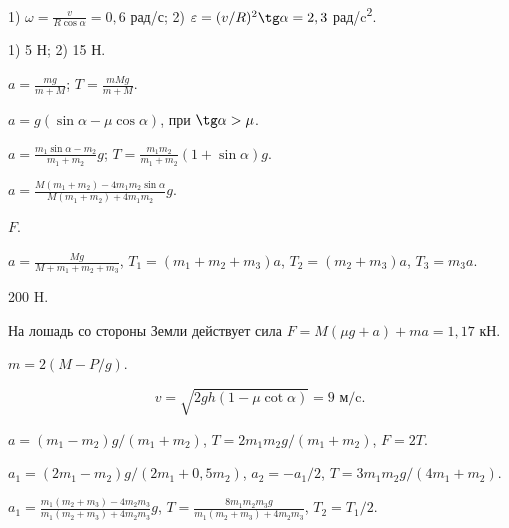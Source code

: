 \begin{Answer}{54}
1) $\omega = \frac{v}{R \cos \alpha} = 0,6$ рад/с; 2) $\varepsilon = (v/R)^2 \tg \alpha = 2,3$ рад/c\textsuperscript{2}.
\end{Answer}
\begin{Answer}{55}
1) 5 Н; 2) 15 Н.
\end{Answer}
\begin{Answer}{56}
$a = \frac{mg}{m+M}$; $T = \frac{mMg}{m+M}$.
\end{Answer}
\begin{Answer}{57}
$a = g (\sin \alpha - \mu \cos \alpha)$, при $\tg \alpha > \mu$.
\end{Answer}
\begin{Answer}{58}
$a = \frac{m_1 \sin \alpha - m_2}{m_1 + m_2}g$; $T = \frac{m_1 m_2}{m_1 + m_2}\left( 1+ \sin \alpha \right)g$.
\end{Answer}
\begin{Answer}{59}
$a = \frac{M(m_1 + m_2) - 4 m_1 m_2 \sin \alpha}{M(m_1 + m_2) + 4 m_1 m_2}g$.
\end{Answer}
\begin{Answer}{60}
$F$.
\end{Answer}
\begin{Answer}{65}
$a = \frac{Mg}{M + m_1 +m_2 +m_3}$, $T_1 = (m_1 +m_2 +m_3)a$, $T_2 = (m_2 +m_3)a$, $T_3 = m_3 a$.
\end{Answer}
\begin{Answer}{66}
200 H.
\end{Answer}
\begin{Answer}{67}
На лошадь со стороны Земли действует сила $F = M(\mu g + a) + ma = 1,17$ кН.
\end{Answer}
\begin{Answer}{68}
$m = 2(M - P/g)$.
\end{Answer}
\begin{Answer}{69}
$$ v = \sqrt{2gh(1 - \mu \cot \alpha)} = 9 \textrm{ м/c}.$$
\end{Answer}
\begin{Answer}{70}
$a = (m_1 - m_2)g / (m_1 + m_2)$, $T = 2 m_1 m_2 g /(m_1 + m_2)$, $F = 2T$.
\end{Answer}
\begin{Answer}{71}
$a_1 = (2m_1-m_2)g/(2m_1+0,5m_2)$, $a_2 = -a_1/2$, $T=3m_1 m_2g/(4m_1 + m_2)$.
\end{Answer}
\begin{Answer}{72}
$a_1 = \frac{m_1(m_2+m_3)-4m_2m_3}{m_1(m_2+m_3)+4m_2m_3}g$, $T= \frac{8m_1m_2m_3g}{m_1(m_2+m_3)+4m_2m_3}$, $T_2 = T_1/2$.
\end{Answer}
